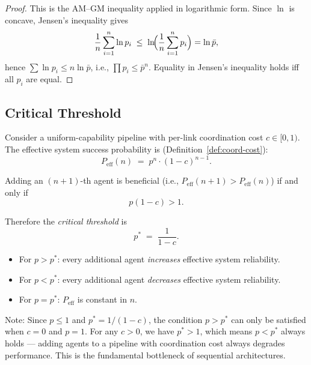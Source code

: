 \begin{proof}
This is the AM--GM inequality applied in logarithmic form. Since $\ln$ is concave,
Jensen's inequality gives
\[
  \frac{1}{n}\sum_{i=1}^{n} \ln p_i \;\leq\; \ln\!\Bigl(\frac{1}{n}\sum_{i=1}^{n} p_i\Bigr) = \ln \bar{p},
\]
hence $\sum \ln p_i \leq n \ln \bar{p}$, i.e., $\prod p_i \leq \bar{p}^n$.
Equality in Jensen's inequality holds iff all $p_i$ are equal.
\end{proof}

\subsection{Critical Threshold}

\begin{theorem}
\label{thm:critical-threshold}
Consider a uniform-capability pipeline with per-link coordination cost $c \in [0,1)$.
The effective system success probability is (Definition~\ref{def:coord-cost}):
\[
  P_{\mathrm{eff}}(n) \;=\; p^n \cdot (1-c)^{n-1}.
\]

Adding an $(n+1)$-th agent is beneficial (i.e., $P_{\mathrm{eff}}(n+1) > P_{\mathrm{eff}}(n)$) if
and only if
\[
  p(1-c) > 1.
\]

Therefore the \emph{critical threshold} is
\[
  \boxed{p^* \;=\; \frac{1}{1-c}.}
\]

\begin{itemize}
  \item For $p > p^*$: every additional agent \emph{increases} effective system reliability.
  \item For $p < p^*$: every additional agent \emph{decreases} effective system reliability.
  \item For $p = p^*$: $P_{\mathrm{eff}}$ is constant in $n$.
\end{itemize}

Note: Since $p \leq 1$ and $p^* = 1/(1-c)$, the condition $p > p^*$ can only be
satisfied when $c = 0$ and $p = 1$. For any $c > 0$, we have $p^* > 1$, which means
$p < p^*$ always holds --- adding agents to a pipeline with coordination cost always
degrades performance. This is the fundamental bottleneck of sequential architectures.
\end{theorem}


